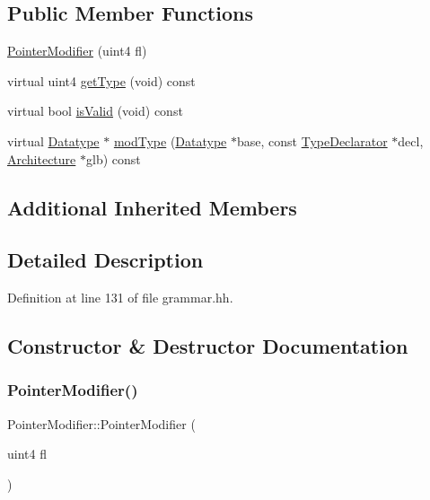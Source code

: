 \subsection*{Public Member Functions}
\begin{DoxyCompactItemize}
\item 
\mbox{\hyperlink{class_pointer_modifier_ad63c0844c0fef7cde3efee9914dd4e99}{Pointer\+Modifier}} (uint4 fl)
\item 
virtual uint4 \mbox{\hyperlink{class_pointer_modifier_a5d4393bc7783b11b1c4d8f3c95aa3000}{get\+Type}} (void) const
\item 
virtual bool \mbox{\hyperlink{class_pointer_modifier_ae1220f9b7a325ac324fcfcf731f9c4cc}{is\+Valid}} (void) const
\item 
virtual \mbox{\hyperlink{class_datatype}{Datatype}} $\ast$ \mbox{\hyperlink{class_pointer_modifier_a75a8aa9b1a6c8b9b4590a1b13f7b1f7a}{mod\+Type}} (\mbox{\hyperlink{class_datatype}{Datatype}} $\ast$base, const \mbox{\hyperlink{class_type_declarator}{Type\+Declarator}} $\ast$decl, \mbox{\hyperlink{class_architecture}{Architecture}} $\ast$glb) const
\end{DoxyCompactItemize}
\subsection*{Additional Inherited Members}


\subsection{Detailed Description}


Definition at line 131 of file grammar.\+hh.



\subsection{Constructor \& Destructor Documentation}
\mbox{\label{class_pointer_modifier_ad63c0844c0fef7cde3efee9914dd4e99}} 
\subsubsection{\texorpdfstring{PointerModifier()}{PointerModifier()}}
{\footnotesize\ttfamily Pointer\+Modifier\+::\+Pointer\+Modifier (\begin{DoxyParamCaption}\item[{uint4}]{fl }\end{DoxyParamCaption})\hspace{0.3cm}{\ttfamily [inline]}}



